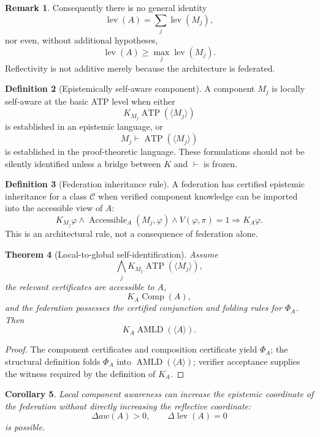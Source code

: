 \documentclass[11pt]{article}
\theoremstyle{definition}
\newtheorem{definition}{Definition}[section]
\newtheorem{remark}[definition]{Remark}
\theoremstyle{plain}
\newtheorem{theorem}[definition]{Theorem}
\newtheorem{corollary}[definition]{Corollary}
\newcommand{\lev}{\operatorname{lev}}
\newcommand{\ATP}{\operatorname{ATP}}
\newcommand{\AMLD}{\operatorname{AMLD}}
\newcommand{\Comp}{\operatorname{Comp}}
\begin{document}
\begin{remark}
Consequently there is no general identity
\[
\lev(A)=\sum_j\lev(M_j),
\]
nor even, without additional hypotheses,
\[
\lev(A)\ge\max_j\lev(M_j).
\]
Reflectivity is not additive merely because the architecture is federated.
\end{remark}

\begin{definition}[Epistemically self-aware component]
A component $M_j$ is locally self-aware at the basic ATP level when either
\[
K_{M_j}\ATP(\langle M_j\rangle)
\]
is established in an epistemic language, or
\[
M_j\vdash\ATP(\langle M_j\rangle)
\]
is established in the proof-theoretic language. These formulations should not be silently identified unless a bridge between $K$ and $\vdash$ is frozen.
\end{definition}

\begin{definition}[Federation inheritance rule]
A federation has certified epistemic inheritance for a class $\mathcal C$ when verified component knowledge can be imported into the accessible view of $A$:
\[
K_{M_j}\varphi\wedge\operatorname{Accessible}_A(M_j,\varphi)\wedge V(\varphi,\pi)=1
\Longrightarrow K_A\varphi.
\]
This is an architectural rule, not a consequence of federation alone.
\end{definition}

\begin{theorem}[Local-to-global self-identification]
Assume
\[
\bigwedge_jK_{M_j}\ATP(\langle M_j\rangle),
\]
the relevant certificates are accessible to $A$,
\[
K_A\Comp(A),
\]
and the federation possesses the certified conjunction and folding rules for $\Phi_A$. Then
\[
K_A\AMLD(\langle A\rangle).
\]
\end{theorem}

\begin{proof}
The component certificates and composition certificate yield $\Phi_A$; the structural definition folds $\Phi_A$ into $\AMLD(\langle A\rangle)$; verifier acceptance supplies the witness required by the definition of $K_A$.
\end{proof}

\begin{corollary}
Local component awareness can increase the epistemic coordinate of the federation without directly increasing the reflective coordinate:
\[
\Delta aw(A)>0,\qquad\Delta\lev(A)=0
\]
is possible.
\end{corollary}
\end{document}
